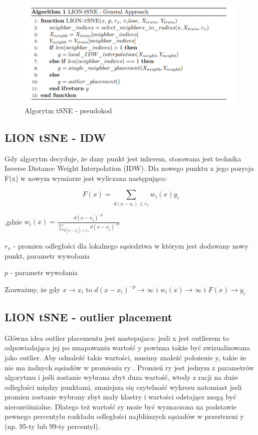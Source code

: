 \documentclass{article}
\begin{document}
\begin{figure}[h]
\includegraphics[scale=0.52]{algorithm_lionTSNE_pseudocode.PNG}
\caption{Algorytm tSNE - pseudokod}
\end{figure}

\subsection{LION tSNE - IDW}

Gdy algorytm decyduje, że dany punkt jest inlierem, stosowana jest
technika Inverse Distance Weight Interpolation (IDW). Dla nowego punktu
x jego pozycja F(x) w nowym wymiarze jest wyliczana następująco:

\begin{equation}
    F(x) = \sum_{d(x - x_i) \leq r_x} w_i(x)y_i 
\end{equation}

,gdzie 
$w_i(x) = \frac{d(x - x_j)^{-p}}{\sum_{d(x-x_j) \leq r_x} d(x - x_j)^{-p}}$

$r_x$ - promien odległości dla lokalnego sąsiedztwa w którym jest dodawany
nowy punkt, parametr wywołania

$p$ - parametr wywołania

Zauważmy, że gdy 
$x \rightarrow x_i$ 
to 
$d(x - x_i)^{-p} \rightarrow \infty$
i 
$w_i(x) \rightarrow \infty$ 
i 
$F(x) \rightarrow y_i$

\subsection{LION tSNE - outlier placement}

Główna idea outlier placementu jest nastepujaca: jesli x jest outlierem to
odpowiadająca jej po zmapowaniu wartość y powinna także być
zwizualizowana jako outlier. Aby odnaleźć takie wartości, musimy znaleźć
położenie y, takie że nie ma żadnych sąsiadów w promieniu ry . Promień ry
jest jednym z parametrów algorytmu i jeśli zostanie wybrana zbyt duza
wartość, wtedy z racji na duże odległości między punktami, zmniejsza się
czytelność wykresu natomiast jesli promien zostanie wybrany zbyt mały
klastry i wartości odstające mogą być nierozróżnialne. Dlatego też wartość
ry może być wyznaczona na podstawie pewnego percentylu rozkładu
odległości najbliższych sąsiadów w przestrzeni y (np. 95-ty lub 99-ty
percentyl).
\end{document}
